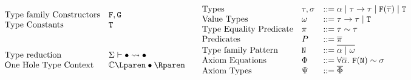 \documentclass[format=acmsmall,manuscript,screen,nonacm,margin=1in,11pt]{acmart}
\begin{document}
\begin{figure}[ht]
    \footnotesize
  \[
    \begin{array}{l l l}
      &\text{Type family Constructors} & \FamCtrs,\MoreFamCtrs\\
      &\text{Type Constants} &\texttt{\TypeCtrs}\\
      \\
      \\
      &\text{Type reduction}              &\tystepsto\GEnv\bullet\bullet
      \\
      &\text{One Hole Type Context}    &\TEvalCtxt{\bullet}
    \end{array}
    \begin{array}{l l l l l}
      &\text{Types}           &\tau,\sigma  &\bnfeq \alpha \bnfor \tau\to\tau %
                                              \bnfor \FamCtrs(\many\tau) \bnfor \TypeCtrs\\%
      &\text{Value Types}    &\GTy         &\bnfeq \tau\to\tau \bnfor \TypeCtrs\\
      &\text{Type Equality Predicate}      &\pi          &\bnfeq \tau\teq\tau\\
      &\text{Predicates}     &\Preds       &\bnfeq \many\pi\\
      &\text{Type family Pattern}     &\texttt{\FamPattern} &\bnfeq \many{\alpha \bnfor \GTy}\\
      &\text{Axiom Equations} &\AxiomEq     &\bnfeq \Forall{\many\alpha}{\FamCtrs(\FamPattern) \teq \sigma}\\
      &\text{Axiom Types}     &\AxiomTy     &\bnfeq \many\AxiomEq\\

\end{array}\]
\end{figure}
\end{document}
